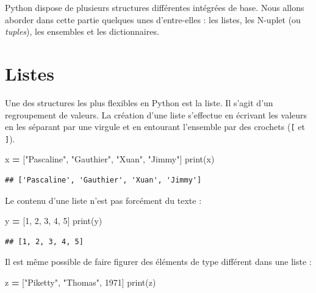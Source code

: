 \documentclass[
  12pt,
]{book}
\newenvironment{Shaded}{\begin{snugshade}}{\end{snugshade}}
\newcommand{\BuiltInTok}[1]{#1}
\newcommand{\DecValTok}[1]{\textcolor[rgb]{0.00,0.00,0.81}{#1}}
\newcommand{\NormalTok}[1]{#1}
\newcommand{\OperatorTok}[1]{\textcolor[rgb]{0.81,0.36,0.00}{\textbf{#1}}}
\newcommand{\StringTok}[1]{\textcolor[rgb]{0.31,0.60,0.02}{#1}}
\numberwithin{equation}{section}
\numberwithin{countremarque}{section}
\begin{document}
Python dispose de plusieurs structures différentes intégrées de base. Nous allons aborder dans cette partie quelques unes d'entre-elles : les listes, les N-uplet (ou \emph{tuples}), les ensembles et les dictionnaires.

\section{Listes}\label{structures-listes}

Une des structures les plus flexibles en Python est la liste. Il s'agit d'un regroupement de valeurs. La création d'une liste s'effectue en écrivant les valeurs en les séparant par une virgule et en entourant l'ensemble par des crochets (\texttt{{[}} et \texttt{{]}}).

\begin{Shaded}
\begin{Highlighting}[]
\NormalTok{x }\OperatorTok{=}\NormalTok{ [}\StringTok{"Pascaline"}\NormalTok{, }\StringTok{"Gauthier"}\NormalTok{, }\StringTok{"Xuan"}\NormalTok{, }\StringTok{"Jimmy"}\NormalTok{]}
\BuiltInTok{print}\NormalTok{(x)}
\end{Highlighting}
\end{Shaded}

\begin{lstlisting}
## ['Pascaline', 'Gauthier', 'Xuan', 'Jimmy']
\end{lstlisting}

Le contenu d'une liste n'est pas forcément du texte :

\begin{Shaded}
\begin{Highlighting}[]
\NormalTok{y }\OperatorTok{=}\NormalTok{ [}\DecValTok{1}\NormalTok{, }\DecValTok{2}\NormalTok{, }\DecValTok{3}\NormalTok{, }\DecValTok{4}\NormalTok{, }\DecValTok{5}\NormalTok{]}
\BuiltInTok{print}\NormalTok{(y)}
\end{Highlighting}
\end{Shaded}

\begin{lstlisting}
## [1, 2, 3, 4, 5]
\end{lstlisting}

Il est même possible de faire figurer des éléments de type différent dans une liste :

\begin{Shaded}
\begin{Highlighting}[]
\NormalTok{z }\OperatorTok{=}\NormalTok{ [}\StringTok{"Piketty"}\NormalTok{, }\StringTok{"Thomas"}\NormalTok{, }\DecValTok{1971}\NormalTok{]}
\BuiltInTok{print}\NormalTok{(z)}
\end{Highlighting}
\end{Shaded}
\end{document}
